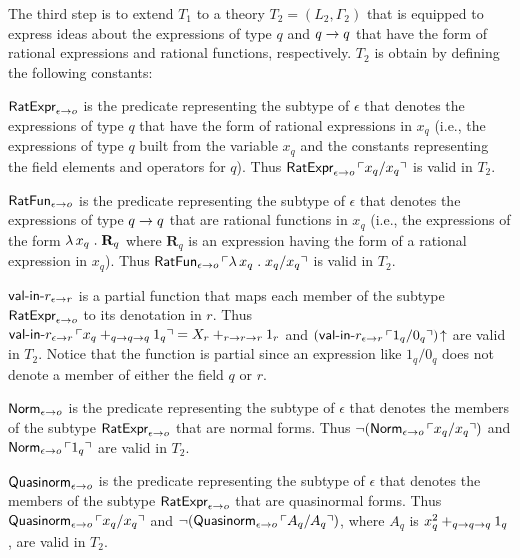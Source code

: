 \documentclass[fleqn]{llncs}
\begin{document}
The third step is to extend $T_1$ to a theory $T_2 = (L_2,\Gamma_2)$
that is equipped to express ideas about the expressions of type $q$
and $q \rightarrow q$ that have the form of rational expressions and
rational functions, respectively.  $T_2$ is obtain by defining
the following constants:

\be

  \item $\mbox{\sf RatExpr}_{\epsilon \rightarrow o}$ is the predicate
    representing the subtype of $\epsilon$ that denotes the
    expressions of type $q$ that have the form of rational expressions
    in $x_q$ (i.e., the expressions of type $q$ built from the
    variable $x_q$ and the constants representing the field elements
    and operators for $q$).  Thus $\mbox{\sf RatExpr}_{\epsilon \rightarrow
      o} \, \ulcorner x_q/x_q\urcorner$ is valid in $T_2$.

  \item $\mbox{\sf RatFun}_{\epsilon \rightarrow o}$ is the predicate
    representing the subtype of $\epsilon$ that denotes the
    expressions of type $q \rightarrow q$ that are rational functions in
    $x_q$ (i.e., the expressions of the form $\lambda\, x_q \mathrel.
    \textbf{R}_q$ where $\textbf{R}_q$ is an expression having the
    form of a rational expression in $x_q$).  Thus
    $\mbox{\sf RatFun}_{\epsilon \rightarrow o} \, \ulcorner\lambda\, x_q
      \mathrel. x_q/x_q\urcorner$ is valid in $T_2$.

  \item \bsp $\mbox{\sf val-in-}r_{\epsilon \rightarrow r}$ is a partial
    function that maps each member of the subtype
    $\mbox{\sf RatExpr}_{\epsilon \rightarrow o}$ to its denotation in $r$.
    Thus $\mbox{\sf val-in-}r_{\epsilon \rightarrow r} \, \ulcorner x_q +_{q
        \rightarrow q \rightarrow q} 1_q\urcorner = X_r +_{r \rightarrow r \rightarrow r} 1_r$
    and $(\mbox{\sf val-in-}r_{\epsilon \rightarrow r} \,
    \ulcorner1_q/0_q\urcorner)\!\uparrow$ are valid in $T_2$.  Notice that
    the function is partial since an expression like $1_q/0_q$ does
    not denote a member of either the field $q$ or $r$. \esp

  \item \bsp $\mbox{\sf Norm}_{\epsilon \rightarrow o}$ is the predicate
    representing the subtype of $\epsilon$ that denotes the members of
    the subtype $\mbox{\sf RatExpr}_{\epsilon \rightarrow o}$ that are normal
    forms.  Thus $\neg(\mbox{\sf Norm}_{\epsilon \rightarrow o}
    \, \ulcorner x_q/x_q\urcorner)$ and $\mbox{\sf Norm}_{\epsilon
      \rightarrow o} \, \ulcorner1_q\urcorner$ are valid in $T_2$.\esp

  \item \bsp $\mbox{\sf Quasinorm}_{\epsilon \rightarrow o}$ is the predicate
    representing the subtype of $\epsilon$ that denotes the members of
    the subtype $\mbox{\sf RatExpr}_{\epsilon \rightarrow o}$ that are
    quasinormal forms.  Thus $\mbox{\sf Quasinorm}_{\epsilon \rightarrow o}
    \, \ulcorner x_q/x_q\urcorner$ and $\neg(\mbox{\sf Quasinorm}_{\epsilon
      \rightarrow o} \, \ulcorner A_q/A_q\urcorner)$, where $A_q$ is $x^{2}_{q}
    +_{q \rightarrow q \rightarrow q} 1_q$, are valid in $T_2$. \esp
\end{document}

